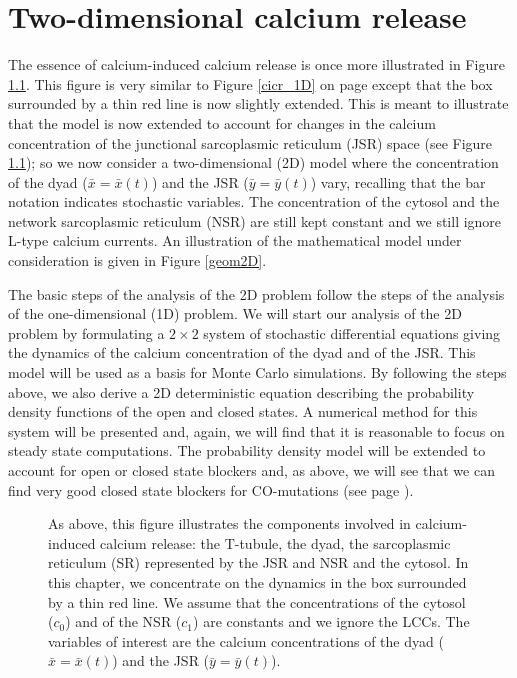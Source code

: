 \chapter{Two-dimensional calcium release}
\label{Ca_release_2D}

The essence of calcium-induced calcium release is once more illustrated in Figure \ref{cicr_2D}. This figure is very similar to Figure \ref{cicr_1D} on page \pageref{cicr_1D} except that the box surrounded by a thin red line is now slightly extended. This is meant to illustrate that the model is now extended to account for changes in the calcium concentration of the junctional sarcoplasmic reticulum (JSR) space (see Figure \ref{cicr_2D}); so we now consider a two-dimensional (2D) model where the concentration of the dyad ($\bar{x}=\bar{x}(t)$) and the JSR ($\bar{y}=\bar{y}(t)$) vary, recalling that the bar notation indicates stochastic variables. The concentration of the cytosol and the network sarcoplasmic reticulum (NSR) are still kept constant and we still ignore L-type calcium currents. An illustration of the mathematical model under consideration is given in Figure \ref{geom2D}.

The basic steps of the analysis of the 2D problem follow the steps of the analysis of the one-dimensional (1D) problem.  We will start our analysis of the 2D problem by formulating a $2\times 2$ system of stochastic differential equations giving the dynamics of the calcium concentration of the dyad and of the JSR. This model will be used as a basis for Monte Carlo simulations. By following the steps above, we also derive a 2D deterministic equation describing the probability density functions of the open and closed states. A numerical method for this system will be presented and, again, we will find that it is reasonable to focus on steady state computations. The probability density model will be extended to account for open or closed state blockers and, as above, we will see that we can find very good closed state blockers for CO-mutations (see page \pageref{com}).

\begin{figure}
\centering{}
\caption{ 
As above, this figure illustrates the components involved in calcium-induced calcium release: the T-tubule, the dyad, the sarcoplasmic reticulum (SR) represented by the JSR and NSR and the cytosol. In this chapter, we concentrate on the dynamics in the box surrounded by a thin red line. We assume that the concentrations of the cytosol ($c_0$) and of the NSR ($c_1$) are constants and we ignore the LCCs. The variables of interest are the calcium concentrations of the dyad ($\bar{x}=\bar{x}(t)$) and the JSR ($\bar{y}=\bar{y}(t)$). \label{cicr_2D}}
\end{figure}


